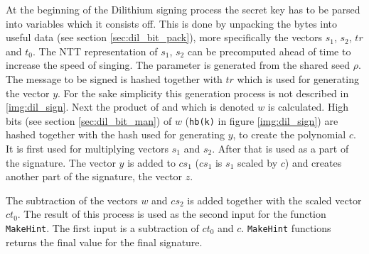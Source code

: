 At the beginning of the Dilithium signing process the secret key has to be parsed into variables which it consists off. This is done by unpacking the bytes into useful data (see section \ref{sec:dil_bit_pack}), more specifically the vectors $s_1$, $s_2$, $tr$ and $t_0$. The NTT representation of $s_1$, $s_2$ can be precomputed ahead of time to increase the speed of singing. The parameter  is generated from the shared seed $\rho$. The message to be signed is hashed together with $tr$ which is used for generating the vector $y$. For the sake simplicity this generation process is not described in \ref{img:dil_sign}. Next the product of  and  which is denoted $w$ is calculated. High bits (see section \ref{sec:dil_bit_man}) of $w$ (\texttt{hb(k)} in figure \ref{img:dil_sign}) are hashed together with the hash used for generating $y$, to create the polynomial $c$. It is first used for multiplying vectors $s_1$ and $s_2$. After that is used as a part of the signature. The vector $y$ is added to $cs_1$ ($cs_1$ is $s_1$ scaled by $c$) and creates another part of the signature, the vector $z$.

The subtraction of the vectors $w$ and $cs_2$ is added together with the scaled vector $ct_0$. The result of this process is used as the second input for the function \texttt{MakeHint}. The first input is a subtraction of $ct_0$ and $c$. \texttt{MakeHint} functions returns the final value for the final signature.


